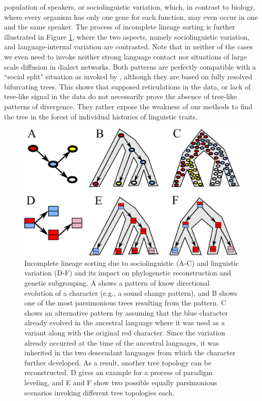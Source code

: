\documentclass[svgnames,12pt]{scrartcl}
\begin{document}
{population of speakers, or sociolinguistic variation, which, in contrast to biology, where every
organism has only one gene for each function, may even occur in one and the same speaker. 
The process of incomplete lineage sorting is further illustrated in Figure \ref{fig:ils}, where the
two aspects, namely sociolinguistic variation, and language-internal variation are contrasted. Note
that in neither of the cases we even need to invoke neither strong language contact nor situations
of large scale diffusion in dialect networks. Both patterns are perfectly compatible with a ``social
split" situation as invoked by \citet{Francois2015}, although they are based on fully resolved
bifurcating trees. This shows that supposed reticulations in the data, or lack of tree-like signal
in the data do not necessarily prove the absence of tree-like patterns of divergence. They rather
expose the weakness of our methods to find the tree in the forest of individual histories of
linguistic traits.  

\begin{figure}[htb]
  \centering
  \includegraphics[width=\textwidth]{images/ils.pdf}
  \caption{Incomplete lineage sorting due to sociolinguistic (A-C) and linguistic variation (D-F) and its impact
  on phylogenetic reconstruction and genetic subgrouping. A shows a pattern of know directional
  evolution of a character (e.g., a sound change pattern), and B shows one of the most parsimonious
  trees resulting from the pattern. C shows an alternative pattern by assuming that the blue
  character already evolved in the ancestral language where it was used as a variant along with the
  original red character. Since the variation already occurred at the time of the ancestral
  languages, it was inherited in the two descendant languages from which the character further
  developed. As a result, another tree topology can be reconstructed. D gives an example for a
  process of paradigm leveling, and E and F show two possible equally parsimonious scenarios
  invoking different tree topologies each.}
  \label{fig:ils}
\end{figure}

}
\end{document}
